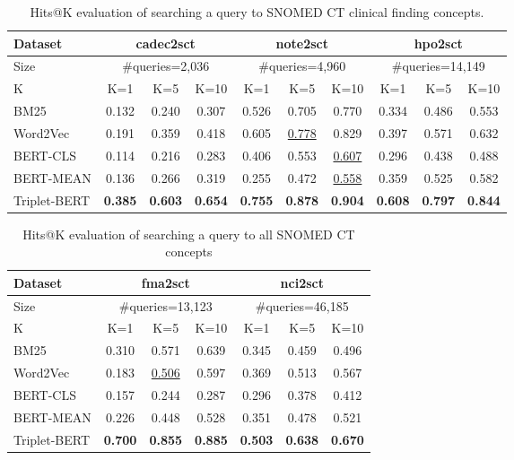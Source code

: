 \documentclass[preprint,12pt]{elsarticle}
\begin{document}
\begin{table}[htbp]
\small
\centering
\caption{Hits@K evaluation of searching a query to SNOMED CT clinical finding concepts.}
\vspace{-0.5em}
\label{Tab:cadecqueryhpo2sct}
    \begin{tabular}{ |l|c|c|c|c|c|c|c|c|c|} 
        \hline
         Dataset & \multicolumn{3}{|c|}{cadec2sct}  & \multicolumn{3}{|c|}{note2sct} & \multicolumn{3}{|c|}{hpo2sct} \\
        \hline
         Size & \multicolumn{3}{|c|}{\#queries=2,036}  & \multicolumn{3}{|c|}{\#queries=4,960} & \multicolumn{3}{|c|}{\#queries=14,149}\\
        \hline
         K & K=1 & K=5 & K=10 & K=1 & K=5 & K=10 & K=1 & K=5 & K=10\\
        \hline
        \hline
        BM25 & 0.132 & 0.240 & 0.307 & 0.526 & 0.705 & 0.770 & 0.334 & 0.486 & 0.553\\
        Word2Vec & 0.191 & 0.359 & 0.418 & 0.605 & \underline{0.778} & 0.829 & 0.397 & 0.571 & 0.632\\
        BERT-CLS & 0.114 & 0.216 & 0.283 & 0.406 & 0.553 & \underline{0.607} & 0.296 & 0.438 & 0.488\\
        BERT-MEAN & 0.136 & 0.266 & 0.319 & 0.255 & 0.472 & \underline{0.558} & 0.359 & 0.525 & 0.582 \\
        Triplet-BERT & \textbf{0.385} & \textbf{0.603} & \textbf{0.654} & \textbf{0.755} & \textbf{0.878} & \textbf{0.904} & \textbf{0.608} & \textbf{0.797} & \textbf{0.844}\\
        \hline
    \end{tabular}
\end{table} 

\begin{table}[htbp]
\small
\centering
\caption{Hits@K evaluation of searching a query to all SNOMED CT concepts}
\vspace{-0.5em}
\label{Tab:fmanci2sct}
    \begin{tabular}{ |l|c|c|c|c|c|c|} 
        \hline
         Dataset & \multicolumn{3}{|c|}{fma2sct} & \multicolumn{3}{|c|}{nci2sct}\\
        \hline
         Size & \multicolumn{3}{|c|}{\#queries=13,123} & \multicolumn{3}{|c|}{\#queries=46,185}\\
        \hline
         K & K=1 & K=5 & K=10 & K=1 & K=5 & K=10 \\
        \hline
        \hline
        BM25 & 0.310 & 0.571 & 0.639 & 0.345 & 0.459 & 0.496\\
        Word2Vec & 0.183 & \underline{0.506} & 0.597 & 0.369 & 0.513 & 0.567\\
        BERT-CLS & 0.157 & 0.244 & 0.287 & 0.296 & 0.378 & 0.412\\
        BERT-MEAN & 0.226 & 0.448 & 0.528 & 0.351 & 0.478 & 0.521\\
        Triplet-BERT & \textbf{0.700} & \textbf{0.855} & \textbf{0.885} & \textbf{0.503} & \textbf{0.638} & \textbf{0.670}\\
        \hline
    \end{tabular}
    \vspace{-10pt}
\end{table} 
\end{document}
